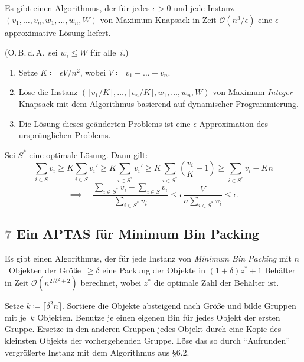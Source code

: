 \documentclass{cheat-sheet}
\renewcommand{\O}{\mathcal{O}} %
\newcommand{\ceil}[1]{\lceil #1 \rceil} %
\newcommand{\floor}[1]{\lfloor #1 \rfloor} %
\newcommand{\Problem}[1]{\textcolor{ProblemColor}{\textbf{#1}}}
\newcommand{\scriptSection}[1]{\textcolor{gray}{#1}\enspace}
\begin{document}
\begin{satz}
  Es gibt einen Algorithmus, der für jedes $\epsilon > 0$ und jede Instanz $(v_1, \ldots, v_n, w_1, \ldots, w_n, W)$ von Maximum Knapsack in Zeit $\O(n^3 / \epsilon)$ eine $\epsilon$-approximative Lösung liefert.
\end{satz}

\begin{alg}
  (O.\,B.\,d.\,A.\ sei $w_i \leq W$ für alle~$i$.)
  \begin{enumerate}
    \item Setze $K \coloneqq \epsilon V / n^2$, wobei $V \coloneqq v_1 + \ldots + v_n$.
    \item Löse die Instanz $(\floor{v_1/K}, \ldots, \floor{v_n/K}, w_1, \ldots, w_n, W)$ von Maximum \textit{Integer} Knapsack mit dem Algorithmus basierend auf dynamischer Programmierung.
    \item Die Lösung dieses geänderten Problems ist eine $\epsilon$-Approximation des ursprünglichen Problems.
  \end{enumerate}
\end{alg}

\begin{beweisskizze}
  Sei $S^*$ eine optimale Lösung.
  Dann gilt:
  \[
    \sum_{i \in S} v_i
    \geq K \sum_{i \in S} v_i'
    \geq K \sum_{i \in S^*} v_i'
    \geq K \sum_{i \in S^*} (\frac{v_i}{K} - 1)
    \geq \sum_{i \in S^*} v_i - K n
  \]
  \[
    \implies \quad
    \frac{{\sum}_{i \in S^*} v_i - {\sum}_{i \in S} v_i}{{\sum}_{i \in S^*} v_i}
    \leq \epsilon \frac{V}{n {\sum}_{i \in S^*} v_i}
    \leq \epsilon.
  \]
\end{beweisskizze}

\subsection{\scriptSection{7} Ein APTAS für \Problem{Minimum Bin Packing}}

\begin{lem}
  Es gibt einen Algorithmus, der für jede Instanz von \textit{Minimum Bin Packing} mit $n$~Objekten der Größe~$\geq \delta$ eine Packung der Objekte in $(1 + \delta) z^* + 1$ Behälter in Zeit $\O(n^{2/\delta^2 + 2})$ berechnet, wobei $z^*$ die optimale Zahl der Behälter ist.
\end{lem}

\begin{alg}
  Setze $k \coloneqq \ceil{\delta^2 n}$.
  Sortiere die Objekte absteigend nach Größe und bilde Gruppen mit je~$k$ Objekten.
  Benutze je einen eigenen Bin für jedes Objekt der ersten Gruppe.
  Ersetze in den anderen Gruppen jedes Objekt durch eine Kopie des kleinsten Objekts der vorhergehenden Gruppe.
  Löse das so durch "`Aufrunden"' vergrößerte Instanz mit dem Algorithmus aus §6.2.
\end{alg}
\end{document}
